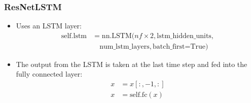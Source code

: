 \documentclass[conference]{IEEEtran}
\begin{document}
\begin{enumerate}
    \subsubsection{ResNetLSTM}
    \begin{itemize}
      \item Uses an LSTM layer: 
        \begin{align*}
          \text{self.lstm} &= \text{nn.LSTM}(nf \times 2, \text{lstm\_hidden\_units}, \\
                                          &\quad \text{num\_lstm\_layers}, \text{batch\_first=True})
        \end{align*}
      \item The output from the LSTM is taken at the last time step and fed into the fully connected layer: 
        \begin{align*}
          x &= x[:, -1, :] \\
          x &= \text{self.fc}(x)
        \end{align*}
    \end{itemize}

\end{enumerate}
\end{document}
